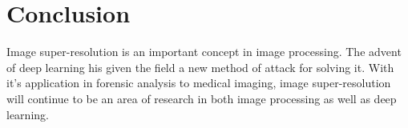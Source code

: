 \chapter{Conclusion}

Image super-resolution is an important concept in image processing. The advent of deep learning his given the field a new method of attack for solving it. With it's application in forensic analysis to medical imaging, image super-resolution will continue to be an area of research in both image processing as well as deep learning.